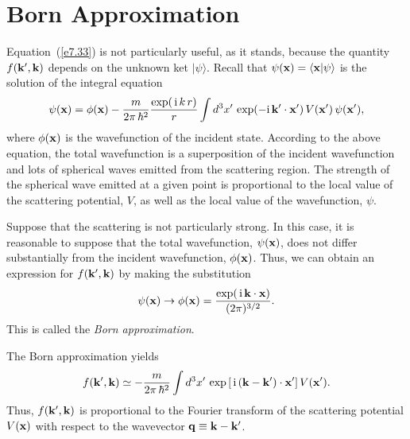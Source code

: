 \section{Born Approximation}
Equation~(\ref{e7.33}) is not particularly useful, as it stands, because the
quantity $f({\bf k}', {\bf k})$ depends on the unknown ket $|\psi\rangle$.
Recall that $\psi({\bf x})=\langle {\bf x}|\psi\rangle$
 is the solution of the integral equation
\begin{equation}
\psi({\bf x}) = \phi({\bf x})-\frac{m}{2\pi\,\hbar^2}
 \frac{\exp(\,{\rm i}\,k\,r)}{r}
\int d^3 x'\, \exp(- {\rm i} \,{\bf k}' \cdot  {\bf x}')\,
V({\bf x}')\, \psi  ({\bf x}'),
\end{equation}
where $\phi({\bf x})$ is the wavefunction of the incident state. 
According to the above equation, the total wavefunction is a superposition
of the incident wavefunction and lots of spherical waves emitted from
the scattering region. The strength of the spherical wave emitted at
a given point is proportional to the local value of the scattering
potential, $V$, as well as the local value of the wavefunction, $\psi$.

Suppose that the scattering is not particularly  strong. In this case, it is
reasonable to suppose that the total wavefunction, $\psi({\bf x})$, does
not differ substantially from the incident wavefunction, $\phi({\bf x})$.
Thus, we can obtain an expression for $f({\bf k}', {\bf k})$ by making
the substitution
\begin{equation}
\psi({\bf x}) \rightarrow \phi({\bf x}) = 
\frac{\exp(\,{\rm i}\,{\bf k} \cdot  {\bf x}  ) }{(2\pi)^{3/2}}.
\end{equation}
This  is called the {\em Born approximation}.

The Born approximation yields
\begin{equation}
f({\bf k}', {\bf k}) \simeq - \frac{m}{2\pi\, \hbar^2} \int d^3  x'\,\exp\left[\,
{\rm i}\, ({\bf k} - {\bf k}')\cdot {\bf x}'\right] 
V({\bf x}').
\end{equation}
Thus, $f({\bf k}', {\bf k})$ is proportional to the Fourier transform
of the scattering potential $V({\bf x})$ with respect to the wavevector
${\bf q} \equiv {\bf k} - {\bf k}'$.

